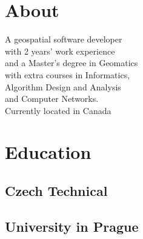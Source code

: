 \documentclass[letterpaper]{deedy-resume} %
\begin{document}
\begin{minipage}[t]{0.33\textwidth} %


\section{About} 

A geospatial software developer \\ 
with 2 years' work experience \\ 
and a Master's degree in Geomatics \\ 
with extra courses in Informatics, \\ 
Algorithm Design and Analysis \\
and Computer Networks. \\
Currently located in Canada

\sectionspace %



\section{Education} 

\subsection{Czech Technical}
\subsection{University in Prague}


\sectionspace %



\sectionspace %


%
%


\end{minipage}
\end{document}
